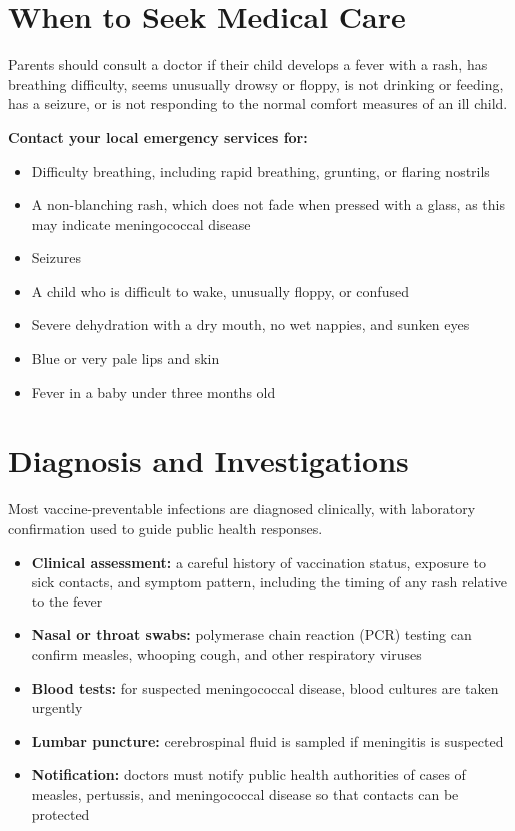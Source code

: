 \section*{When to Seek Medical Care}
Parents should consult a doctor if their child develops a fever with a rash, has breathing difficulty, seems unusually drowsy or floppy, is not drinking or feeding, has a seizure, or is not responding to the normal comfort measures of an ill child.

\textbf{Contact your local emergency services for:}
\begin{itemize}
    \item Difficulty breathing, including rapid breathing, grunting, or flaring nostrils
    \item A non-blanching rash, which does not fade when pressed with a glass, as this may indicate meningococcal disease
    \item Seizures
    \item A child who is difficult to wake, unusually floppy, or confused
    \item Severe dehydration with a dry mouth, no wet nappies, and sunken eyes
    \item Blue or very pale lips and skin
    \item Fever in a baby under three months old
\end{itemize}

\section*{Diagnosis and Investigations}
Most vaccine-preventable infections are diagnosed clinically, with laboratory confirmation used to guide public health responses.

\begin{itemize}
    \item \textbf{Clinical assessment:} a careful history of vaccination status, exposure to sick contacts, and symptom pattern, including the timing of any rash relative to the fever
    \item \textbf{Nasal or throat swabs:} polymerase chain reaction (PCR) testing can confirm measles, whooping cough, and other respiratory viruses
    \item \textbf{Blood tests:} for suspected meningococcal disease, blood cultures are taken urgently
    \item \textbf{Lumbar puncture:} cerebrospinal fluid is sampled if meningitis is suspected
    \item \textbf{Notification:} doctors must notify public health authorities of cases of measles, pertussis, and meningococcal disease so that contacts can be protected
\end{itemize}

